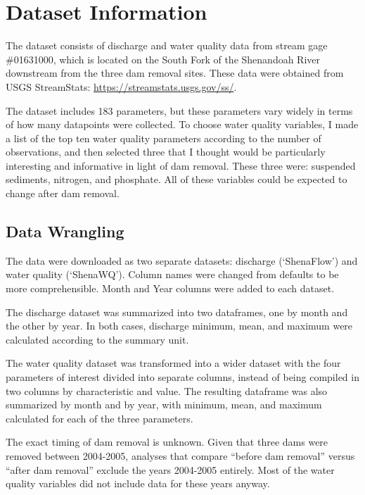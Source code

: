\documentclass[
  12pt,
]{article}
\begin{document}
\newpage

\hypertarget{dataset-information}{%
\section{Dataset Information}\label{dataset-information}}

The dataset consists of discharge and water quality data from stream
gage \#01631000, which is located on the South Fork of the Shenandoah
River downstream from the three dam removal sites. These data were
obtained from USGS StreamStats: \url{https://streamstats.usgs.gov/ss/}.

The dataset includes 183 parameters, but these parameters vary widely in
terms of how many datapoints were collected. To choose water quality
variables, I made a list of the top ten water quality parameters
according to the number of observations, and then selected three that I
thought would be particularly interesting and informative in light of
dam removal. These three were: suspended sediments, nitrogen, and
phosphate. All of these variables could be expected to change after dam
removal.

\hypertarget{data-wrangling}{%
\subsection{Data Wrangling}\label{data-wrangling}}

The data were downloaded as two separate datasets: discharge
(`ShenaFlow') and water quality (`ShenaWQ'). Column names were changed
from defaults to be more comprehensible. Month and Year columns were
added to each dataset.

The discharge dataset was summarized into two dataframes, one by month
and the other by year. In both cases, discharge minimum, mean, and
maximum were calculated according to the summary unit.

The water quality dataset was transformed into a wider dataset with the
four parameters of interest divided into separate columns, instead of
being compiled in two columns by characteristic and value. The resulting
dataframe was also summarized by month and by year, with minimum, mean,
and maximum calculated for each of the three parameters.

The exact timing of dam removal is unknown. Given that three dams were
removed between 2004-2005, analyses that compare ``before dam removal''
versus ``after dam removal'' exclude the years 2004-2005 entirely. Most
of the water quality variables did not include data for these years
anyway.
\end{document}
